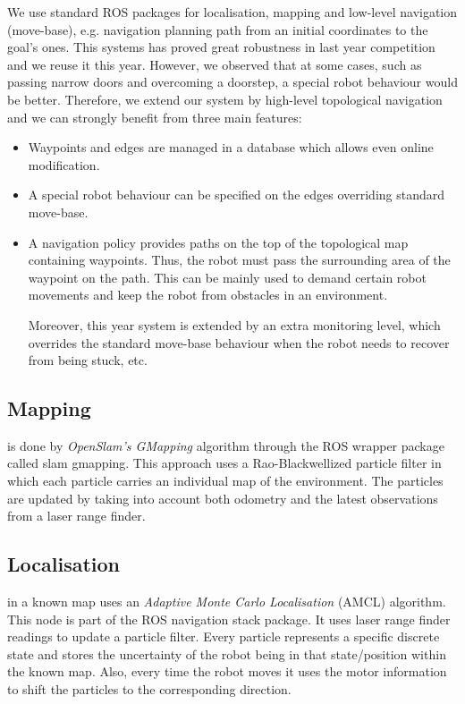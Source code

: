 We use standard ROS packages for localisation, mapping and low-level navigation (move-base), e.g. navigation planning path from an initial coordinates to the goal's ones. 
This systems has proved great robustness in last year competition and we reuse it this year. However, we observed that at some cases, such as passing narrow doors and overcoming a doorstep, a special robot behaviour would be better. 
Therefore, we extend our system by high-level topological navigation \cite{jaime} and we can strongly benefit from three main features:
\begin{itemize}
\item Waypoints and edges are managed in a database which allows even online modification.  
\item A special robot behaviour can be specified on the edges overriding standard move-base.
\item A navigation policy \cite{bruno} provides paths on the top of the topological map containing waypoints. 
 Thus, the robot must pass the surrounding area of the waypoint on the path. This can be mainly used to demand certain robot movements and keep the robot from obstacles in an environment.
 
Moreover, this year system is extended by an extra monitoring level, which overrides the standard move-base behaviour when the robot needs to recover from being stuck, etc. 

\end{itemize}

\subsection{Mapping} is done by \textit{OpenSlam's GMapping} algorithm \cite{slam} through the ROS wrapper package called \textsf{slam gmapping}. This approach uses a Rao-Blackwellized particle filter in which each particle carries an individual map of the environment. The particles are updated by taking into account both odometry and the latest observations from a laser range finder.

\subsection{Localisation} in a known map uses an \textit{Adaptive Monte Carlo Localisation} (AMCL)\cite{amcl} algorithm. This node is part of the ROS \textsf{navigation stack} package. It uses laser range finder readings to update a particle filter. Every particle represents a specific discrete state and stores the uncertainty of the robot being in that state/position within the known map. Also, every time the robot moves it uses the motor information to shift the particles to the corresponding direction.

